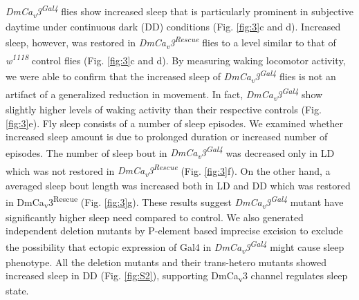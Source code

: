 \emph{DmCa\textsubscript{v}3\textsuperscript{Gal4}} flies show increased sleep that is particularly prominent in subjective daytime under continuous dark (DD) conditions (Fig. \ref{fig:3}c and d).
Increased sleep, however, was restored in \emph{DmCa\textsubscript{v}3\textsuperscript{Rescue}} flies to a level similar to that of \emph{w\textsuperscript{1118}} control flies (Fig. \ref{fig:3}c and d).
By measuring waking locomotor activity, we were able to confirm that the increased sleep of \emph{DmCa\textsubscript{v}3\textsuperscript{Gal4}} flies is not an artifact of a generalized reduction in movement. In fact, \emph{DmCa\textsubscript{v}3\textsuperscript{Gal4}} show slightly higher levels of waking activity than their respective controls (Fig. \ref{fig:3}e).
Fly sleep consists of a number of sleep episodes.
We examined whether increased sleep amount is due to prolonged duration or increased number of episodes.
The number of sleep bout in \emph{DmCa\textsubscript{v}3\textsuperscript{Gal4}} was decreased only in LD which was not restored in \emph{DmCa\textsubscript{v}3\textsuperscript{Rescue}} (Fig. \ref{fig:3}f).
On the other hand, a averaged sleep bout length was increased both in LD and DD which was restored in DmCa\textsubscript{v}3\textsuperscript{Rescue} (Fig. \ref{fig:3}g).
These results suggest \emph{DmCa\textsubscript{v}3\textsuperscript{Gal4}} mutant have significantly higher sleep need compared to control.
We also generated independent deletion mutants by P-element based imprecise excision to exclude the possibility that ectopic expression of Gal4 in \emph{DmCa\textsubscript{v}3\textsuperscript{Gal4}} might cause sleep phenotype.
All the deletion mutants and their trans-hetero mutants showed increased sleep in DD (Fig. \ref{fig:S2}), supporting DmCa\textsubscript{v}3 channel regulates sleep state.
    
  
  
  
  
  
  
  
  
  